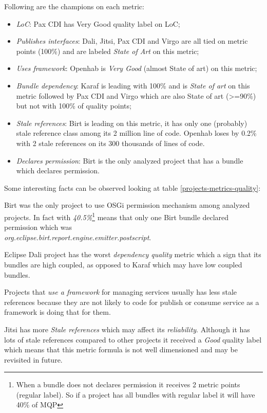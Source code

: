 Following are the champions on each metric:


\begin{itemize}
\item \emph{LoC}: Pax CDI has Very Good quality label on LoC;
\item \emph{Publishes interfaces}: Dali, Jitsi, Pax CDI and Virgo are all tied on metric points (100\%) and are labeled \emph{State of Art} on this metric;
\item \emph{Uses framework}: Openhab is \emph{Very Good} (almost State of art) on this metric;
\item \emph{Bundle dependency}: Karaf is leading with 100\% and is \emph{State of art} on this metric followed by Pax CDI and Virgo which are also State of art (>=90\%) but not with 100\% of quality points;  
\item \emph{Stale references}: Birt is leading on this metric, it has only one (probably) stale reference class among its 2 million line of code. Openhab loses by 0.2\% with 2 stale references on its 300 thousands of lines of code.  
\item \emph{Declares permission}: Birt is the only analyzed project that has a bundle which declares permission.
\end{itemize}

Some interesting facts can be observed looking at table \ref{projects-metrics-quality}:

Birt was the only project to use OSGi permission mechanism among analyzed projects. In fact with \emph{40.5\%}\footnote{When a bundle does not declares permission it receives 2 metric points (regular label). So if a project has all bundles with regular label it will have 40\% of MQP} means that only one Birt bundle declared permission which was \\\emph{org.eclipse.birt.report.engine.emitter.postscript}.

Eclipse Dali project has the worst \emph{dependency quality} metric which a sign that its bundles are high coupled, as opposed to Karaf which may have low coupled bundles.

Projects that \emph{use a framework} for managing services usually has less stale references because they are not likely to code for publish or consume service as a framework is doing that for them.

Jitsi has more \emph{Stale references} which may affect its \emph{reliability}. Although it has lots of stale references compared to other projects it received a \emph{Good} quality label which means that this metric formula is not well dimensioned and may be revisited in future.    

